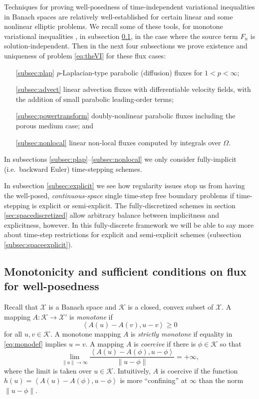 \documentclass[final,leqno,onefignum,onetabnum]{siamltex1213bueler}
\newcommand{\ip}[2]{\ensuremath{\left<#1,#2\right>}}
\begin{document}
Techniques for proving well-posedness of time-independent variational inequalities in Banach spaces are relatively well-established for certain linear and some nonlinear elliptic problems.  We recall some of these tools, for monotone variational inequalities \cite{KinderlehrerStampacchia1980}, in subsection \ref{subsec:mono}, in the case where the source term $F_n$ is solution-independent.  Then in the next four subsections we prove existence and uniqueness of problem \eqref{eq:theVI} for these flux cases:
\begin{itemize}
\item[\ref{subsec:plap}] $p$-Laplacian-type parabolic (diffusion) fluxes for $1<p<\infty$;
\item[\ref{subsec:advect}] linear advection fluxes with differentiable velocity fields, with the addition of small parabolic leading-order terms;
\item[\ref{subsec:powertransform}] doubly-nonlinear parabolic fluxes including the porous medium case; and
\item[\ref{subsec:nonlocal}] linear non-local fluxes computed by integrals over $\Omega$.
\end{itemize}
In subsections \ref{subsec:plap}--\ref{subsec:nonlocal} we only consider fully-implicit (i.e.~backward Euler) time-stepping schemes.

In subsection \ref{subsec:explicit} we see how regularity issues stop us from having the well-posed, \emph{continuous-space} single time-step free boundary problems if time-stepping is explicit or semi-explicit.  The fully-discretized schemes in section \ref{sec:spacediscretized} allow arbitrary balance between implicitness and explicitness, however.  In this fully-discrete framework we will be able to say more about time-step restrictions for explicit and semi-explicit schemes (subsection \ref{subsec:spaceexplicit}).

\subsection{Monotonicity and sufficient conditions on flux for well-posedness} \label{subsec:mono}  Recall that $\mathcal{X}$ is a Banach space and $\mathcal{K}$ is a closed, convex subset of $\mathcal{X}$.  A mapping $A : \mathcal{K} \to \mathcal{X}'$ is \emph{monotone} \cite{KinderlehrerStampacchia1980} if
\begin{equation}
   \ip{A(u) - A(v)}{u-v} \ge 0  \label{eq:monodef}
\end{equation}
for all $u,v\in\mathcal{K}$.  A monotone mapping $A$ is \emph{strictly monotone} if equality in \eqref{eq:monodef} implies $u=v$.  A mapping $A$ is \emph{coercive} \cite{KinderlehrerStampacchia1980} if there is $\phi\in \mathcal{K}$ so that
\begin{equation}
   \lim_{\|u\|\to\infty} \frac{\ip{A(u) - A(\phi)}{u-\phi}}{\|u-\phi\|} = +\infty, \label{eq:coercivedef}
\end{equation}
where the limit is taken over $u\in\mathcal{K}$.  Intuitively, $A$ is coercive if the function $h(u)=\ip{A(u) - A(\phi)}{u-\phi}$ is more ``confining'' at $\infty$ than the norm $\|u-\phi\|$.
\end{document}
